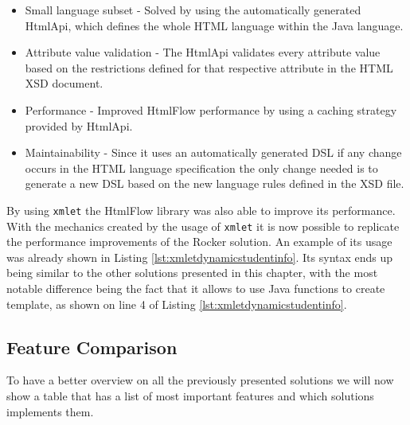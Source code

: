\begin{itemize}
	\item Small language subset - Solved by using the automatically generated HtmlApi, which defines the whole \ac{HTML} language within the Java language.
	\item Attribute value validation - The HtmlApi validates every attribute value based on the restrictions defined for that respective attribute in the \ac{HTML} \ac{XSD} document.
	\item Performance - Improved HtmlFlow performance by using a caching strategy provided by HtmlApi.
	\item Maintainability - Since it uses an automatically generated \ac{DSL} if any change occurs in the \ac{HTML} language specification the only change needed is to generate a new \ac{DSL} based on the new language rules defined in the \ac{XSD} file.
\end{itemize}

\noindent
By using \texttt{xmlet} the HtmlFlow library was also able to improve its performance. With the mechanics created by the usage of \texttt{xmlet} it is now possible to replicate the performance improvements of the Rocker solution. An example of its usage was already shown in Listing \ref{lst:xmletdynamicstudentinfo}. Its syntax ends up being similar to the other solutions presented in this chapter, with the most notable difference being the fact that it allows to use Java functions to create template, as shown on line 4 of Listing \ref{lst:xmletdynamicstudentinfo}.

\newpage

\subsection{Feature Comparison}
\label{sec:featurecomparison}

To have a better overview on all the previously presented solutions we will now show a table that has a list of most important features and which solutions implements them.

